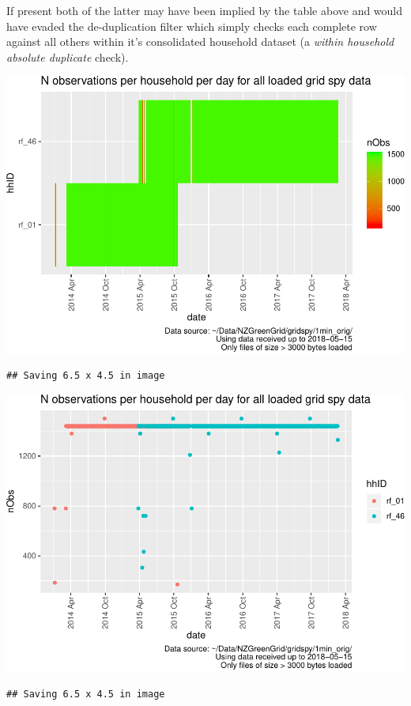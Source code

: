 \documentclass[]{article}
\begin{document}
If present both of the latter may have been implied by the table above
and would have evaded the de-duplication filter which simply checks each
complete row against all others within it's consolidated household
dataset (a \emph{within household absolute duplicate} check).

\includegraphics{processNZGGElecCons1minData_v2_files/figure-latex/loadedFilesObsPlots-1.pdf}

\begin{verbatim}
## Saving 6.5 x 4.5 in image
\end{verbatim}

\includegraphics{processNZGGElecCons1minData_v2_files/figure-latex/loadedFilesObsPlots-2.pdf}

\begin{verbatim}
## Saving 6.5 x 4.5 in image
\end{verbatim}
\end{document}
